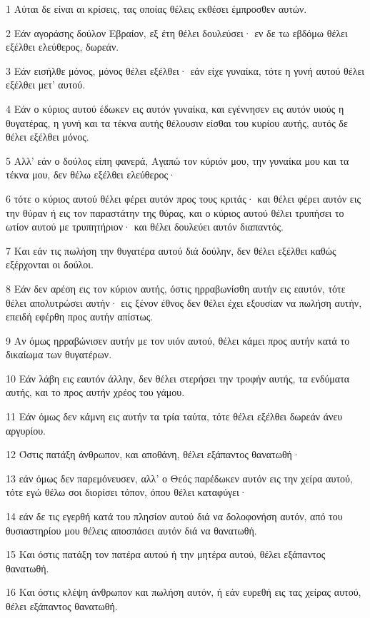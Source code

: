 \par 1 Αύται δε είναι αι κρίσεις, τας οποίας θέλεις εκθέσει έμπροσθεν αυτών.
\par 2 Εάν αγοράσης δούλον Εβραίον, εξ έτη θέλει δουλεύσει· εν δε τω εβδόμω θέλει εξέλθει ελεύθερος, δωρεάν.
\par 3 Εάν εισήλθε μόνος, μόνος θέλει εξέλθει· εάν είχε γυναίκα, τότε η γυνή αυτού θέλει εξέλθει μετ' αυτού.
\par 4 Εάν ο κύριος αυτού έδωκεν εις αυτόν γυναίκα, και εγέννησεν εις αυτόν υιούς η θυγατέρας, η γυνή και τα τέκνα αυτής θέλουσιν είσθαι του κυρίου αυτής, αυτός δε θέλει εξέλθει μόνος.
\par 5 Αλλ' εάν ο δούλος είπη φανερά, Αγαπώ τον κύριόν μου, την γυναίκα μου και τα τέκνα μου, δεν θέλω εξέλθει ελεύθερος·
\par 6 τότε ο κύριος αυτού θέλει φέρει αυτόν προς τους κριτάς· και θέλει φέρει αυτόν εις την θύραν ή εις τον παραστάτην της θύρας, και ο κύριος αυτού θέλει τρυπήσει το ωτίον αυτού με τρυπητήριον· και θέλει δουλεύει αυτόν διαπαντός.
\par 7 Και εάν τις πωλήση την θυγατέρα αυτού διά δούλην, δεν θέλει εξέλθει καθώς εξέρχονται οι δούλοι.
\par 8 Εάν δεν αρέση εις τον κύριον αυτής, όστις ηρραβωνίσθη αυτήν εις εαυτόν, τότε θέλει απολυτρώσει αυτήν· εις ξένον έθνος δεν θέλει έχει εξουσίαν να πωλήση αυτήν, επειδή εφέρθη προς αυτήν απίστως.
\par 9 Αν όμως ηρραβώνισεν αυτήν με τον υιόν αυτού, θέλει κάμει προς αυτήν κατά το δικαίωμα των θυγατέρων.
\par 10 Εάν λάβη εις εαυτόν άλλην, δεν θέλει στερήσει την τροφήν αυτής, τα ενδύματα αυτής, και το προς αυτήν χρέος του γάμου.
\par 11 Εάν όμως δεν κάμνη εις αυτήν τα τρία ταύτα, τότε θέλει εξέλθει δωρεάν άνευ αργυρίου.
\par 12 Όστις πατάξη άνθρωπον, και αποθάνη, θέλει εξάπαντος θανατωθή·
\par 13 εάν όμως δεν παρεμόνευσεν, αλλ' ο Θεός παρέδωκεν αυτόν εις την χείρα αυτού, τότε εγώ θέλω σοι διορίσει τόπον, όπου θέλει καταφύγει·
\par 14 εάν δε τις εγερθή κατά του πλησίον αυτού διά να δολοφονήση αυτόν, από του θυσιαστηρίου μου θέλεις αποσπάσει αυτόν διά να θανατωθή.
\par 15 Και όστις πατάξη τον πατέρα αυτού ή την μητέρα αυτού, θέλει εξάπαντος θανατωθή.
\par 16 Και όστις κλέψη άνθρωπον και πωλήση αυτόν, ή εάν ευρεθή εις τας χείρας αυτού, θέλει εξάπαντος θανατωθή.
